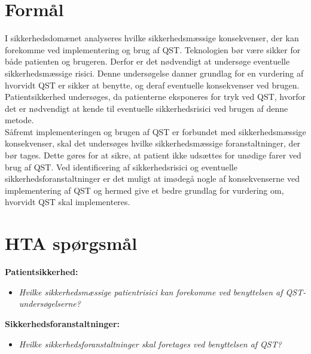 

\section{Formål} 
I sikkerhedsdomænet analyseres hvilke sikkerhedsmæssige konsekvenser, der kan forekomme ved implementering og brug af QST. Teknologien bør være sikker for både patienten og brugeren. Derfor er det nødvendigt at undersøge eventuelle sikkerhedsmæssige risici. Denne undersøgelse danner grundlag for en vurdering af hvorvidt QST er sikker at benytte, og deraf eventuelle konsekvenser ved brugen. \\
Patientsikkerhed undersøges, da patienterne eksponeres for tryk ved QST, hvorfor det er nødvendigt at kende til eventuelle sikkerhedsrisici ved brugen af denne metode. \\
Såfremt implementeringen og brugen af QST er forbundet med sikkerhedsmæssige konsekvenser, skal det undersøges hvilke sikkerhedsmæssige foranstaltninger, der bør tages. Dette gøres for at sikre, at patient ikke udsættes for unødige farer ved brug af QST. Ved identificering af sikkerhedsrisici og eventuelle sikkerhedsforanstaltninger er det muligt at imødegå nogle af konsekvenserne ved implementering af QST og hermed give et bedre grundlag for vurdering om, hvorvidt QST skal implementeres.


\section{HTA spørgsmål}
\textbf{Patientsikkerhed:}
\begin{itemize}
\item \textit{Hvilke sikkerhedsmæssige patientrisici kan forekomme ved benyttelsen af QST-undersøgelserne?} %
\end{itemize}
\textbf{Sikkerhedsforanstaltninger:}
\begin{itemize}
\item \textit{Hvilke sikkerhedsforanstaltninger skal foretages ved benyttelsen af QST?}  %
\end{itemize}



